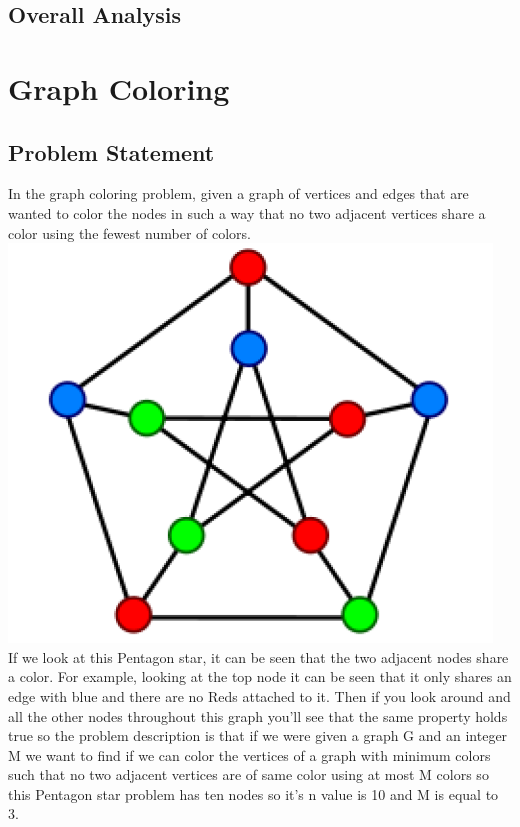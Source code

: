 \documentclass[11pt, letterpaper]{article}
\begin{document}
\subsection {Overall Analysis}

\newpage

\section{Graph Coloring}
\subsection {Problem Statement}
In the graph coloring problem, given a graph of vertices and edges that are wanted to color the
nodes in such a way that no two adjacent vertices share a color using the fewest number of colors.
\includegraphics[scale=0.8]{images/graphCol.PNG}\\[1cm]
If we look at this Pentagon star, it can be seen that the two adjacent nodes share a color. For 
example, looking at the top node it can be seen that it only shares an edge with blue and there 
are no Reds attached to it. Then if you look around and all the other nodes throughout this graph 
you'll see that the same property holds true so the problem description is that if we were given a 
graph G and an integer M we want to find if we can color the vertices of a graph with minimum 
colors such that no two adjacent vertices are of same color using at most M colors so this Pentagon 
star problem has ten nodes so it's n value is 10 and M is equal to 3.\\
\end{document}
